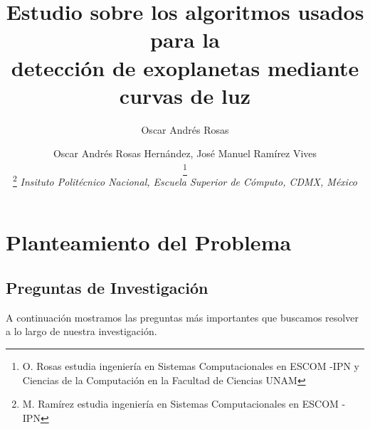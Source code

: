 \documentclass[fleqn, journal]{IEEEtran}                        %
\author{Oscar Andrés Rosas}                                     %
\theoremstyle{break}                                            %
\begin{document}
    \title{Estudio sobre los algoritmos usados para la \\ detección de exoplanetas mediante curvas de luz}

    \author{
        Oscar Andrés Rosas Hernández,
        José Manuel Ramírez Vives
    
        \thanks {
            O. Rosas estudia ingeniería en Sistemas Computacionales en ESCOM -IPN y Ciencias de
            la Computación en la Facultad de Ciencias UNAM
        }
        
        \thanks {
            M. Ramírez estudia ingeniería en Sistemas Computacionales en ESCOM -IPN
        }
        \textit{
            Insituto Politécnico Nacional, Escuela Superior de Cómputo, CDMX, México
        }
    }
    


    \maketitle


\section{Planteamiento del Problema}

    \subsection{Preguntas de Investigación}

        A continuación mostramos las preguntas más importantes que buscamos
        resolver a lo largo de nuestra investigación.
\end{document}
